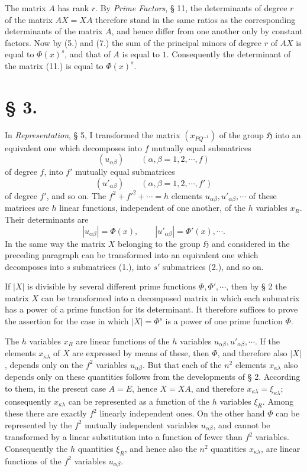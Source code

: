 \documentclass[11pt]{article}
\newcommand{\Hgr}{\mathfrak{H}}
\begin{document}
The matrix $A$ has rank $r$. By \emph{Prime Factors}, § 11, the determinants of degree $r$ of the matrix $AX=XA$ therefore stand in the same ratios as the corresponding determinants of the matrix $A$, and hence differ from one another only by constant factors. Now by (5.) and (7.) the sum of the principal minors of degree $r$ of $AX$ is equal to $\Phi(x)^s$, and that of $A$ is equal to $1$. Consequently the determinant of the matrix (11.) is equal to $\Phi(x)^s$.

\section*{§ 3.}

In \emph{Representation}, § 5, I transformed the matrix $(x_{PQ^{-1}})$ of the group $\Hgr$ into an equivalent one which decomposes into $f$ mutually equal submatrices
\begin{equation}\tag{1.}
(u_{\alpha\beta})\qquad(\alpha,\beta=1,2,\cdots,f)
\end{equation}
of degree $f$, into $f'$ mutually equal submatrices
\begin{equation}\tag{2.}
(u'_{\alpha\beta})\qquad(\alpha,\beta=1,2,\cdots,f')
\end{equation}
of degree $f'$, and so on. The $f^2+f'^2+\cdots=h$ elements $u_{\alpha\beta},u'_{\alpha\beta},\cdots$ of these matrices are $h$ linear functions, independent of one another, of the $h$ variables $x_R$. Their determinants are
\[
|u_{\alpha\beta}|=\Phi(x),\qquad |u'_{\alpha\beta}|=\Phi'(x),\cdots.
\]
In the same way the matrix $X$ belonging to the group $\Hgr$ and considered in the preceding paragraph can be transformed into an equivalent one which decomposes into $s$ submatrices (1.), into $s'$ submatrices (2.), and so on.

If $|X|$ is divisible by several different prime functions $\Phi,\Phi',\cdots$, then by § 2 the matrix $X$ can be transformed into a decomposed matrix in which each submatrix has a power of a prime function for its determinant. It therefore suffices to prove the assertion for the case in which $|X|=\Phi^s$ is a power of one prime function $\Phi$.

The $h$ variables $x_R$ are linear functions of the $h$ variables $u_{\alpha\beta},u'_{\alpha\beta},\cdots$. If the elements $x_{\kappa\lambda}$ of $X$ are expressed by means of these, then $\Phi$, and therefore also $|X|$, depends only on the $f^2$ variables $u_{\alpha\beta}$. But that each of the $n^2$ elements $x_{\kappa\lambda}$ also depends only on these quantities follows from the developments of § 2. According to them, in the present case $A=E$, hence $X=XA$, and therefore $x_{\kappa\lambda}=\xi_{\kappa\lambda}$; consequently $x_{\kappa\lambda}$ can be represented as a function of the $h$ variables $\xi_R$. Among these there are exactly $f^2$ linearly independent ones. On the other hand $\Phi$ can be represented by the $f^2$ mutually independent variables $u_{\alpha\beta}$, and cannot be transformed by a linear substitution into a function of fewer than $f^2$ variables. Consequently the $h$ quantities $\xi_R$, and hence also the $n^2$ quantities $x_{\kappa\lambda}$, are linear functions of the $f^2$ variables $u_{\alpha\beta}$.
\end{document}

